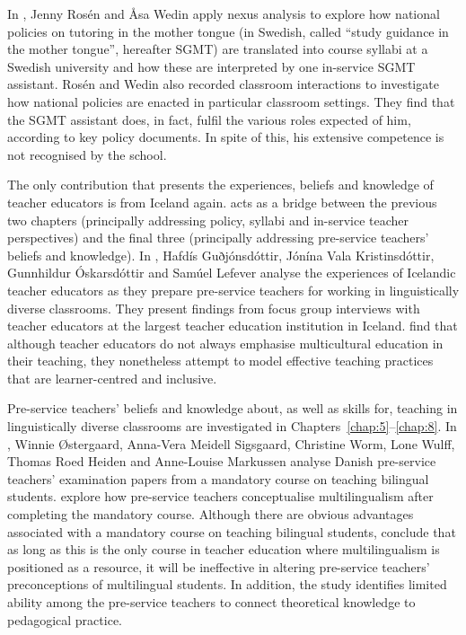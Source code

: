 \documentclass[output=paper]{langscibook}
\begin{document}
In , Jenny Rosén and Åsa Wedin  apply nexus analysis to explore how national policies on tutoring in the mother tongue (in Swedish, called “study guidance in the mother tongue”, hereafter SGMT) are translated into course syllabi at a Swedish university and how these are interpreted by one in-service SGMT assistant. Rosén and Wedin also recorded classroom interactions to investigate how national policies are enacted in particular classroom settings. They find that the SGMT assistant does, in fact, fulfil the various roles expected of him, according to key policy documents. In spite of this, his extensive competence is not recognised by the school.

\begin{sloppypar}
The only contribution that presents the experiences, beliefs and knowledge of teacher educators is from Iceland again.  acts as a bridge between the previous two chapters (principally addressing policy, syllabi and in\hyp service teacher perspectives) and the final three (principally addressing pre\hyp service teachers’ beliefs and knowledge). In , Hafdís Guðjónsdóttir, Jónína Vala Kristinsdóttir, Gunnhildur Óskarsdóttir and Samúel Lefever analyse the experiences of Icelandic teacher educators as they prepare pre-service teachers for working in linguistically diverse classrooms. They present findings from focus group interviews with teacher educators at the largest teacher education institution in Iceland. \citeauthor{chapters/4_gudjonsdottir} find that although teacher educators do not always emphasise multicultural education in their teaching, they nonetheless attempt to model effective teaching practices that are learner\hyp centred and inclusive.  
\end{sloppypar}

Pre-service teachers’ beliefs and knowledge about, as well as skills for, teaching in linguistically diverse classrooms are investigated in Chapters~\ref{chap:5}--\ref{chap:8}. In , Winnie Østergaard, Anna-Vera Meidell Sigsgaard, Christine Worm, Lone Wulff, Thomas Roed Heiden and Anne-Louise Markussen analyse Danish pre-service teachers’ examination papers from a mandatory course on teaching bilingual students. \citeauthor{chapters/5_ostergaard} explore how pre-service teachers conceptualise multilingualism after completing the mandatory course. Although there are obvious advantages associated with a mandatory course on teaching bilingual students, \citeauthor{chapters/5_ostergaard} conclude that as long as this is the only course in teacher education where multilingualism is positioned as a resource, it will be ineffective in altering pre-service teachers’ preconceptions of multilingual students. In addition, the study identifies limited ability among the pre-service teachers to connect theoretical knowledge to pedagogical practice.   
\end{document}
